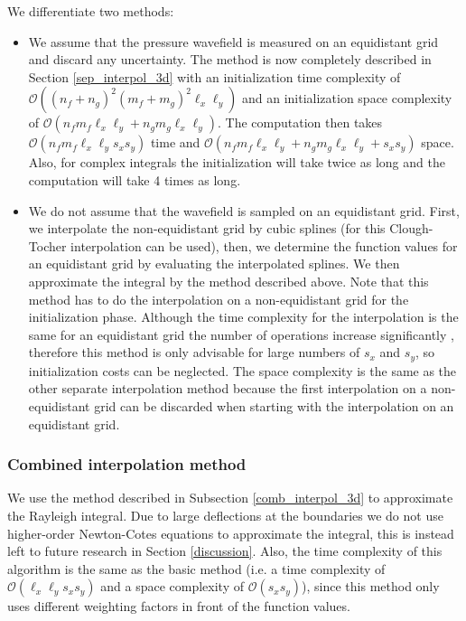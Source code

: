 We differentiate two methods:
\begin{itemize}
    \item We assume that the pressure wavefield is measured on an equidistant grid and discard any uncertainty. The method is now completely described in Section \ref{sep_interpol_3d} with an initialization time complexity of $\mathcal O((n_f+n_g)^2(m_f+m_g)^2 \ell_x \ell_y)$ and an initialization space complexity of $\mathcal O(n_fm_f\ell_x \ell_y + n_gm_g\ell_x \ell_y)$.
        The computation then takes $\mathcal O(n_f m_f \ell_x \ell_y s_x s_y)$ time and $\mathcal O(n_f m_f \ell_x \ell_y + n_g m_g \ell_x \ell_y + s_x s_y)$ space.
        Also, for complex integrals the initialization will take twice as long and the computation will take 4 times as long.
    \item We do not assume that the wavefield is sampled on an equidistant grid. First, we interpolate the non-equidistant grid by cubic splines (for this Clough-Tocher interpolation can be used), then, we determine the function values for an equidistant grid by evaluating the interpolated splines.
        We then approximate the integral by the method described above.
        Note that this method has to do the interpolation on a non-equidistant grid for the initialization phase.
        Although the time complexity for the interpolation is the same for an equidistant grid the number of operations increase significantly \cite[]{scipy}, therefore this method is only advisable for large numbers of $s_x$ and $s_y$, so initialization costs can be neglected.
        The space complexity is the same as the other separate interpolation method because the first interpolation on a non-equidistant grid can be discarded when starting with the interpolation on an equidistant grid.
\end{itemize}

\subsubsection{Combined interpolation method}
We use the method described in Subsection \ref{comb_interpol_3d} to approximate the Rayleigh integral.
Due to large deflections at the boundaries we do not use higher-order Newton-Cotes equations to approximate the integral, this is instead left to future research in Section \ref{discussion}.
Also, the time complexity of this algorithm is the same as the basic method (i.e. a time complexity of $\mathcal O(\ell_x\ell_y s_x s_y)$ and a space complexity of $\mathcal O(s_x s_y)$), since this method only uses different weighting factors in front of the function values.

